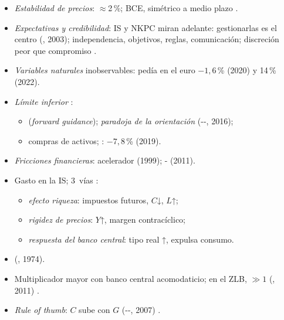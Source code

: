 \documentclass{article}
\begin{document}
\begin{columnas}
\begin{itemize}
\item \emph{Estabilidad de precios}: $\approx$2\,\%; BCE, simétrico a medio plazo .
\item \emph{Expectativas y credibilidad}: IS y NKPC miran adelante: gestionarlas es el centro (, 2003); independencia, objetivos, reglas, comunicación; discreción peor que compromiso .
\item \emph{Variables naturales} inobservables:  pedía en el euro $-1{,}6$\,\% (2020) y 14\,\% (2022).
\item \emph{Límite inferior} :
  \begin{itemize}
  \item {} (\emph{forward guidance}); \emph{paradoja de la orientación} (--, 2016);
  \item compras de activos; : $-7{,}8$\,\% (2019).
  \end{itemize}
\item \emph{Fricciones financieras}: acelerador (1999); - (2011).
\end{itemize}
\begin{itemize}
\item Gasto en la IS; 3~vías :
  \begin{itemize}
  \item \emph{efecto riqueza}: impuestos futuros, $C$↓, $L$↑;
  \item \emph{rigidez de precios}: $Y$↑, margen contracíclico;
  \item \emph{respuesta del banco central}: tipo real ↑, expulsa consumo.
  \end{itemize}
\item {} (, 1974).
\item Multiplicador mayor con banco central acomodaticio; en el ZLB, $\gg1$ (, 2011) .
\item \emph{Rule of thumb}: $C$ sube con $G$ (--, 2007) .
\end{itemize}


\end{columnas}
\end{document}
